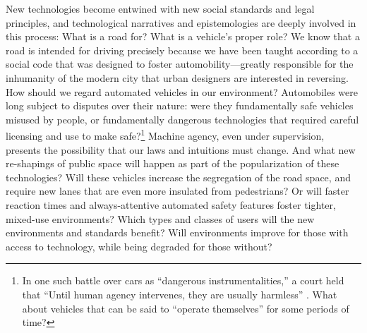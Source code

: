 


New technologies become entwined with new social standards
and legal principles, and technological narratives and epistemologies are deeply involved
in this process: What is a road for? What is a vehicle's
proper role? We know that a road is intended for driving precisely
because we have been taught according to a social code that was
designed to foster automobility---greatly responsible for the
inhumanity of the modern city that urban designers are interested
in reversing. How should we regard automated vehicles in our environment?
Automobiles were long subject to disputes over their nature: were they
fundamentally safe vehicles misused by people, or fundamentally
dangerous technologies that required careful licensing and use to
make safe?\footnote{In one such battle over cars as ``dangerous
instrumentalities,'' a court held that ``Until human agency
intervenes, they are usually 
harmless'' \cite[p. 70]{lochlannjain}. What about vehicles that can
be said to ``operate
themselves'' for some periods of time?} Machine agency, even under
supervision, presents the 
possibility that our laws and intuitions must change.
And what new re-shapings of public space will happen as part of the 
popularization of these technologies? Will these vehicles increase the
segregation of the road space, and require new lanes that are even
more insulated from pedestrians? Or will faster reaction times and
always-attentive automated safety features foster tighter, mixed-use
environments? Which types and classes of users will the new environments
and standards benefit? Will environments improve for those with access
to technology, while being degraded for those without?


